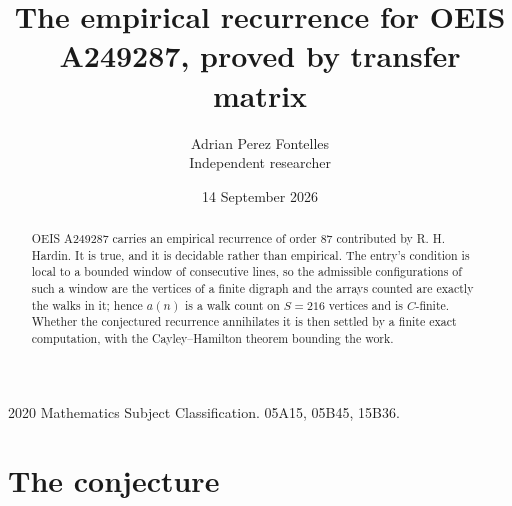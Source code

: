 \documentclass[11pt,a4paper]{article}
\title{The empirical recurrence for OEIS A249287, proved by transfer matrix}
\author{Adrian Perez Fontelles\\ \small Independent researcher}
\date{14 September 2026}
\theoremstyle{plain}
\theoremstyle{definition}
\begin{document}
\maketitle

\begin{abstract}
OEIS A249287 carries an empirical recurrence of order $87$ contributed by R. H. Hardin. It is
true, and it is decidable rather than empirical. The entry's condition is local to a bounded window of consecutive lines, so
the admissible configurations of such a window are the vertices of a finite digraph and the
arrays counted are exactly the walks in it; hence $a(n)$ is a walk count on $S=216$ vertices
and is $C$-finite. Whether the conjectured recurrence annihilates it is then settled by a
finite exact computation, with the Cayley--Hamilton theorem bounding the work.
\end{abstract}

\noindent\small 2020 Mathematics Subject Classification. 05A15, 05B45, 15B36.\normalsize

\section{The conjecture}
\end{document}
